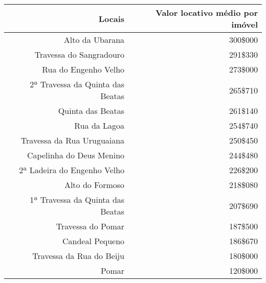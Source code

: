 \begin{table}[!htp]
{
\begin{tabular}{rr}
\toprule
Locais	&Valor locativo médio por imóvel\\
\midrule
\midrule
Alto da Ubarana	&300\$000\\
Travessa do Sangradouro	&291\$330\\
Rua do Engenho Velho	&273\$000\\
2ª Travessa da Quinta das Beatas	&265\$710\\
Quinta das Beatas	&261\$140\\
Rua da Lagoa	&254\$740\\
Travessa da Rua Uruguaiana	&250\$450\\
Capelinha do Deus Menino	&244\$480\\
2ª Ladeira do Engenho Velho	&226\$200\\
Alto do Formoso	&218\$080\\
1ª Travessa da Quinta das Beatas	&207\$690\\
Travessa do Pomar	&187\$500\\
Candeal Pequeno	&186\$670\\
Travessa da Rua do Beiju	&180\$000\\
Pomar	&120\$000\\
\bottomrule
\end{tabular}
}
{}
\end{table}